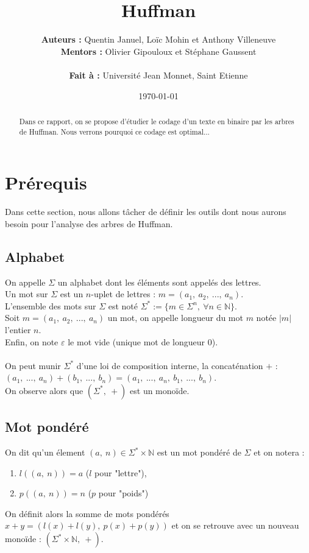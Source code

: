 \documentclass[a4paper, 12pt]{article}
\title{Huffman}
\author{
\textbf{Auteurs :} Quentin Januel, Loïc Mohin et Anthony Villeneuve \\
\textbf{Mentors :} Olivier Gipouloux et Stéphane Gaussent \\ \\
\textbf{Fait à :} Université Jean Monnet, Saint Etienne
}
\date{\today}
\begin{document}
\maketitle
\begin{abstract}
Dans ce rapport, on se propose d'étudier le codage d'un texte en binaire par les arbres de Huffman. Nous verrons pourquoi ce codage est optimal...
\end{abstract}
\newpage
\tableofcontents{}
\newpage

\section{Prérequis}

Dans cette section, nous allons tâcher de définir les outils dont nous aurons besoin pour l'analyse des arbres de Huffman.

\subsection{Alphabet}
On appelle $\Sigma$ un alphabet dont les éléments sont appelés des lettres. \\
Un mot sur $\Sigma$ est un $n$-uplet de lettres : $m = (a_1,\ a_2,\ ...,\ a_n)$. \\
L'ensemble des mots sur $\Sigma$ est noté $\Sigma^* := \{m \in \Sigma^n,\ \forall n \in \mathbb{N}\}$. \\
Soit $m = (a_1,\ a_2,\ ...,\ a_n)$ un mot, on appelle longueur du mot $m$ notée $|m|$ l'entier $n$. \\
Enfin, on note $\varepsilon$ le mot vide (unique mot de longueur $0$). \\ \\
On peut munir $\Sigma^*$ d'une loi de composition interne, la concaténation $+$ : \\
$(a_1,\ ...,\ a_n)+(b_1,\ ...,\ b_n) = (a_1,\ ...,\ a_n,\ b_1,\ ...,\ b_n)$. \\
On observe alors que $(\Sigma^*,\ +)$ est un monoïde.

\subsection{Mot pondéré}
On dit qu'un élement $(a,\ n)\in \Sigma^*\times \mathbb{N}$ est un mot pondéré de $\Sigma$ et on notera :
\begin{enumerate}
\item $l((a,\ n)) = a$ ($l$ pour "lettre"),
\item $p((a,\ n)) = n$ ($p$ pour "poids")
\end{enumerate}
On définit alors la somme de mots pondérés $x+y = (l(x)+l(y),\ p(x)+p(y))$ et on se retrouve avec un nouveau monoïde :  $(\Sigma^*\times \mathbb{N},\ +)$.
\end{document}
